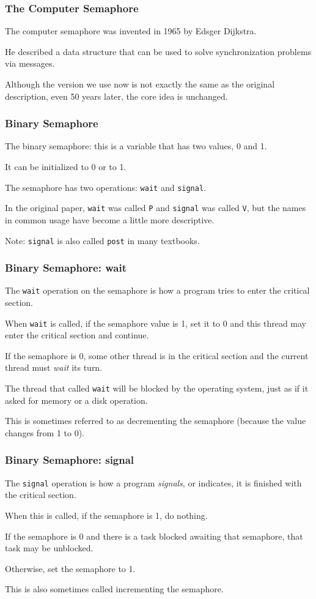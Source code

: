 \begin{frame}
\frametitle{The Computer Semaphore}

The computer semaphore was invented in 1965 by Edsger Dijkstra.

He described a data structure that can be used to solve synchronization problems via messages. 

Although the version we use now is not exactly the same as the original description, even 50 years later, the core idea is unchanged.


\end{frame}

\begin{frame}
\frametitle{Binary Semaphore}

The \alert{binary semaphore}: this is a variable that has two values, 0 and 1. 

It can be initialized to 0 or to 1. 

The semaphore has two operations: \texttt{wait} and \texttt{signal}. 

In the original paper, \texttt{wait} was called \texttt{P} and \texttt{signal} was called \texttt{V}, but the names in common usage have become a little more descriptive. 

Note: \texttt{signal} is also called \texttt{post} in many textbooks.


\end{frame}

\begin{frame}
\frametitle{Binary Semaphore: wait}

The \texttt{wait} operation on the semaphore is how a program tries to enter the critical section.

 When \texttt{wait} is called, if the semaphore value is 1, set it to 0 and this thread may enter the critical section and continue. 
 
 If the semaphore is 0, some other thread is in the critical section and the current thread must \textit{wait} its turn. 
 
 The thread that called \texttt{wait} will be blocked by the operating system, just as if it asked for memory or a disk operation. 
 
 This is sometimes referred to as decrementing the semaphore (because the value changes from 1 to 0).

\end{frame}

\begin{frame}
\frametitle{Binary Semaphore: signal}

The \texttt{signal} operation is how a program \textit{signals}, or indicates, it is finished with the critical section. 

When this is called, if the semaphore is 1, do nothing.

If the semaphore is 0 and there is a task blocked awaiting that semaphore, that task may be unblocked.

Otherwise, set the semaphore to 1. 

This is also sometimes called incrementing the semaphore.

\end{frame}

